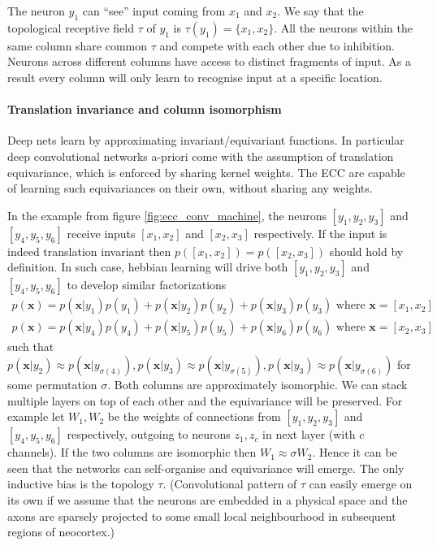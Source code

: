 \documentclass[12pt]{article}
\begin{document}
The neuron $y_1$ can ``see'' input coming from $x_1$ and $x_2$. We say that the topological receptive field $\tau$ of $y_1$ is $\tau(y_1)=\{x_1,x_2\}$. All the neurons
within the same column share common $\tau$ and compete with each other due to inhibition. Neurons across different columns have access to distinct fragments of input. As a result every column will only learn to recognise input at a specific location. 

\paragraph{Translation invariance and column isomorphism}  Deep nets learn by approximating invariant/equivariant functions. In particular deep convolutional networks a-priori come with the assumption of translation equivariance, which is enforced by sharing kernel weights. The ECC are capable of learning such equivariances on their own, without sharing any weights.

In the example from figure \ref{fig:ecc_conv_machine}, the neurons $[y_1,y_2,y_3]$ and $[y_4,y_5,y_6]$ receive inputs $[x_1,x_2]$ and $[x_2,x_3]$ respectively. If the input is indeed translation invariant then $p([x_1,x_2])=p([x_2,x_3])$ should hold by definition. In such case, hebbian learning will drive both $[y_1,y_2,y_3]$ and $[y_4,y_5,y_6]$ to develop similar factorizations
\begin{gather*}
	p(\boldsymbol{x}) = p(\boldsymbol{x}|y_1)p(y_1)+  p(\boldsymbol{x}|y_2)p(y_2)+  p(\boldsymbol{x}|y_3)p(y_3)\text{ where }\boldsymbol{x}=[x_1,x_2] \\
	p(\boldsymbol{x}) = p(\boldsymbol{x}|y_4)p(y_4)+  p(\boldsymbol{x}|y_5)p(y_5)+  p(\boldsymbol{x}|y_6)p(y_6)\text{ where }\boldsymbol{x}=[x_2,x_3]
\end{gather*}
such that $p(\boldsymbol{x}|y_2) \approx p(\boldsymbol{x}|y_{\sigma(4)}), p(\boldsymbol{x}|y_{3}) \approx p(\boldsymbol{x}|y_{\sigma(5)}),p(\boldsymbol{x}|y_3) \approx p(\boldsymbol{x}|y_{\sigma(6)}) $ for some permutation $\sigma$. Both columns are approximately isomorphic. We can stack multiple layers on top of each other and the equivariance will be preserved. For example let $W_1,W_2$ be the weights of connections from $[y_1,y_2,y_3]$ and   $[y_4,y_5,y_6]$ respectively, outgoing to  neurons $z_1,z_c$ in next layer (with $c$ channels). If the two columns are isomorphic then $W_1\approx\sigma W_2$. Hence it can be seen that the networks can self-organise and equivariance will emerge. The only inductive bias is the topology $\tau$. (Convolutional pattern of $\tau$ can easily emerge on its own if we assume that the neurons are embedded in a physical space and the axons are sparsely projected to some small local neighbourhood in subsequent regions of neocortex.)
\end{document}
